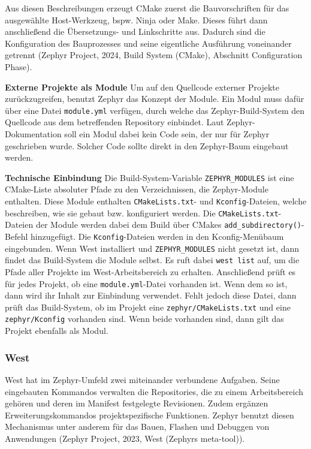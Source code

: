 Aus diesen Beschreibungen erzeugt CMake zuerst die Bauvorschriften f{\"u}r das ausgew{\"a}hlte Host-Werkzeug, bspw. Ninja oder Make. Dieses f{\"u}hrt dann anschlie{\ss}end die {\"U}bersetzungs- und Linkschritte aus. Dadurch sind die Konfiguration des Bauprozesses und seine eigentliche Ausf{\"u}hrung voneinander getrennt (Zephyr Project, 2024, \glqq{}Build System (CMake)\grqq{}, Abschnitt \glqq{}Configuration Phase\grqq{}).

\textbf{Externe Projekte als Module} Um auf den Quellcode externer Projekte zur{\"u}ckzugreifen, benutzt Zephyr das Konzept der \glqq{}Module\grqq{}. Ein Modul muss daf{\"u}r {\"u}ber eine Datei \lstinline[style=fileinline]|module.yml| verf{\"u}gen, durch welche das Zephyr-Build-System den Quellcode aus dem betreffenden Repository einbindet. Laut Zephyr-Dokumentation soll ein Modul dabei kein Code sein, der nur f{\"u}r Zephyr geschrieben wurde. Solcher Code sollte direkt in den Zephyr-Baum eingebaut werden.

\textbf{Technische Einbindung} Die Build-System-Variable \lstinline[style=fileinline]|ZEPHYR_MODULES| ist eine CMake-Liste absoluter Pfade zu den Verzeichnissen, die Zephyr-Module enthalten. Diese Module enthalten \lstinline[style=fileinline]|CMakeLists.txt|- und \lstinline[style=fileinline]|Kconfig|-Dateien, welche beschreiben, wie sie gebaut bzw. konfiguriert werden. Die \lstinline[style=fileinline]|CMakeLists.txt|-Dateien der Module werden dabei dem Build {\"u}ber CMakes \lstinline[style=fileinline]|add_subdirectory()|-Befehl hinzugef{\"u}gt. Die \lstinline[style=fileinline]|Kconfig|-Dateien werden in den Kconfig-Men{\"u}baum eingebunden. Wenn West installiert und \lstinline[style=fileinline]|ZEPHYR_MODULES| nicht gesetzt ist, dann findet das Build-System die Module selbst. Es ruft dabei \lstinline[style=fileinline]|west list| auf, um die Pfade aller Projekte im West-Arbeitsbereich zu erhalten. Anschlie{\ss}end pr{\"u}ft es f{\"u}r jedes Projekt, ob eine \lstinline[style=fileinline]|module.yml|-Datei vorhanden ist. Wenn dem so ist, dann wird ihr Inhalt zur Einbindung verwendet. Fehlt jedoch diese Datei, dann pr{\"u}ft das Build-System, ob im Projekt eine \lstinline[style=fileinline]|zephyr/CMakeLists.txt| und eine \lstinline[style=fileinline]|zephyr/Kconfig| vorhanden sind. Wenn beide vorhanden sind, dann gilt das Projekt ebenfalls als Modul.

\subsubsection{West}
West hat im Zephyr-Umfeld zwei miteinander verbundene Aufgaben. Seine eingebauten Kommandos verwalten die Repositories, die zu einem Arbeitsbereich geh{\"o}ren und deren im Manifest festgelegte Revisionen. Zudem erg{\"a}nzen Erweiterungskommandos projektspezifische Funktionen. Zephyr benutzt diesen Mechanismus unter anderem f{\"u}r das Bauen, Flashen und Debuggen von Anwendungen (Zephyr Project, 2023, \glqq{}West (Zephyr\grq{}s meta-tool)\grqq{}).

